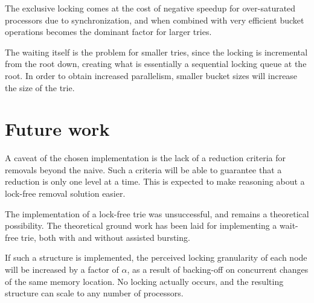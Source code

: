 The exclusive locking comes at the cost of negative speedup for over-saturated
processors due to synchronization, and when combined with very efficient bucket
operations becomes the dominant factor for larger tries.

The waiting itself is the problem for smaller tries, since the locking is
incremental from the root down, creating what is essentially a sequential
locking queue at the root. In order to obtain increased parallelism, smaller
bucket sizes will increase the size of the trie.

\section{Future work}
A caveat of the chosen implementation is the lack of a reduction criteria
for removals beyond the naive. Such a criteria will be able to guarantee
that a reduction is only one level at a time. This is expected to  make
reasoning about a lock-free removal solution easier.

The implementation of a lock-free trie was unsuccessful, and remains a
theoretical possibility. The theoretical ground work has been laid for
implementing a wait-free trie, both with and without assisted bursting.

If such a structure is implemented, the perceived locking granularity of each
node will be increased by a factor of $\alpha$, as a result of backing-off on
concurrent changes of the same memory location. No locking actually occurs,
and the resulting structure can scale to any number of processors.
